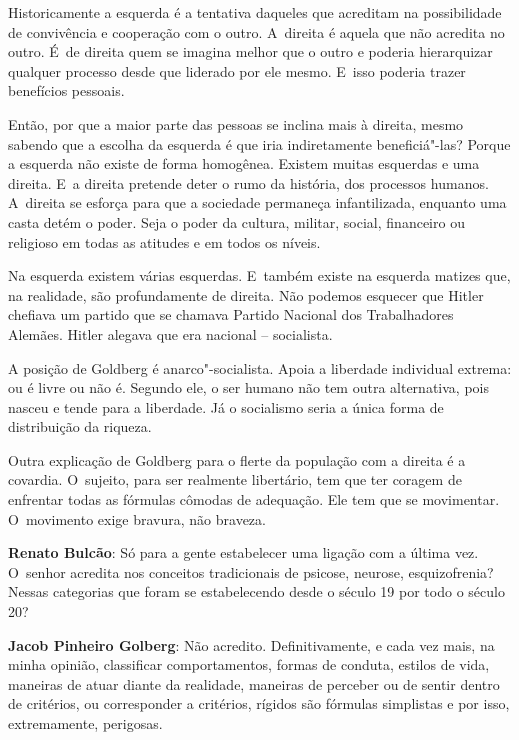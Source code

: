 Historicamente a esquerda é a tentativa daqueles que acreditam na
possibilidade de convivência e cooperação com o outro. A~direita é
aquela que não acredita no outro. É~de direita quem se imagina melhor
que o outro e poderia hierarquizar qualquer processo desde que liderado
por ele mesmo. E~isso poderia trazer benefícios pessoais.

Então, por que a maior parte das pessoas se inclina mais à direita, mesmo
sabendo que a escolha da esquerda é que iria indiretamente
beneficiá"-las? Porque a esquerda não existe de forma homogênea. Existem
muitas esquerdas e uma direita. E~a direita pretende deter o rumo da
história, dos processos humanos. A~direita se esforça para que a
sociedade permaneça infantilizada, enquanto uma casta detém o poder.
Seja o poder da cultura, militar, social, financeiro ou religioso em
todas as atitudes e em todos os níveis.

 

Na esquerda existem várias esquerdas. E~também existe na esquerda
matizes que, na realidade, são profundamente de direita. Não podemos
esquecer que Hitler chefiava um partido que se chamava Partido Nacional
dos Trabalhadores Alemães. Hitler alegava que era nacional --
socialista.

A posição de Goldberg é anarco"-socialista. Apoia a liberdade individual
extrema: ou é livre ou não é. Segundo ele, o ser humano não tem outra
alternativa, pois nasceu e tende para a liberdade. Já o socialismo seria
a única forma de distribuição da riqueza.

Outra explicação de Goldberg para o flerte da população com a direita é
a covardia. O~sujeito, para ser realmente libertário, tem que ter
coragem de enfrentar todas as fórmulas cômodas de adequação. Ele tem que
se movimentar. O~movimento exige bravura, não braveza.

\begin{center}\asterisc{}\end{center}


\abrefala 

\textbf{Renato Bulcão}: Só para a gente estabelecer uma ligação com a
última vez. O~senhor acredita nos conceitos tradicionais de psicose,
neurose, esquizofrenia? Nessas categorias que foram se estabelecendo
desde o século 19 por todo o século 20?

 

\textbf{Jacob Pinheiro Golberg}: Não acredito. Definitivamente, e cada
vez mais, na minha opinião, classificar comportamentos, formas de
conduta, estilos de vida, maneiras de atuar diante da realidade,
maneiras de perceber ou de sentir dentro de critérios, ou corresponder a
critérios, rígidos são fórmulas simplistas e por isso, extremamente,
perigosas.

